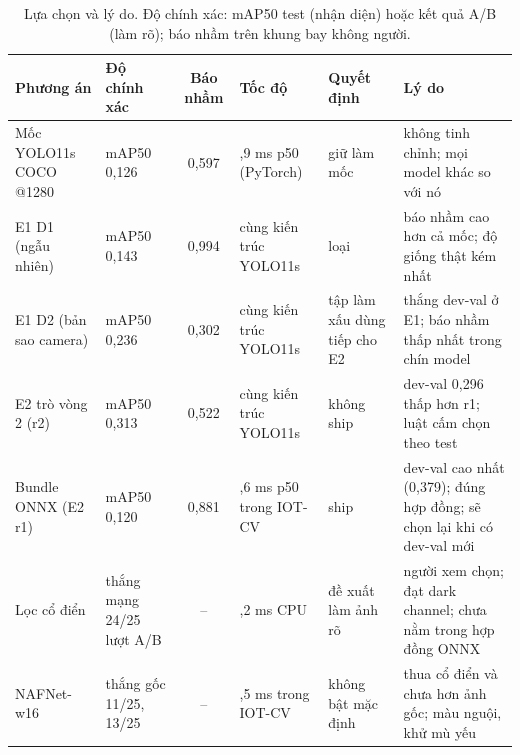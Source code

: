 \begin{table}[!htbp]
\centering\footnotesize
\caption[Lựa chọn và lý do]{Lựa chọn và lý do. Độ chính xác: mAP50 test (nhận diện) hoặc kết quả A/B (làm rõ); báo nhầm trên khung bay không người.}
\label{tab:luachon}
\begin{tabularx}{\textwidth}{@{}>{\raggedright\arraybackslash}p{2.6cm} >{\raggedright\arraybackslash}p{2.3cm} c >{\raggedright\arraybackslash}p{1.7cm} >{\raggedright\arraybackslash}p{1.8cm} X@{}}
\toprule
Phương án & Độ chính xác & Báo nhầm & Tốc độ & Quyết định & Lý do \\
\midrule
Mốc YOLO11s COCO @1280 & mAP50 0,126 & 0,597 & 20,9 ms p50 (PyTorch) & giữ làm mốc & không tinh chỉnh; mọi model khác so với nó \\
\addlinespace
E1 D1 (ngẫu nhiên) & mAP50 0,143 & 0,994 & cùng kiến trúc YOLO11s & loại & báo nhầm cao hơn cả mốc; độ giống thật kém nhất \\
\addlinespace
E1 D2 (bản sao camera) & mAP50 0,236 & 0,302 & cùng kiến trúc YOLO11s & tập làm xấu dùng tiếp cho E2 & thắng dev-val ở E1; báo nhầm thấp nhất trong chín model \\
\addlinespace
E2 trò vòng 2 (r2) & mAP50 0,313 & 0,522 & cùng kiến trúc YOLO11s & không ship & dev-val 0,296 thấp hơn r1; luật cấm chọn theo test \\
\addlinespace
Bundle ONNX (E2 r1) & mAP50 0,120 & 0,881 & 23,6 ms p50 trong IOT-CV & ship & dev-val cao nhất (0,379); đúng hợp đồng; sẽ chọn lại khi có dev-val mới \\
\addlinespace
Lọc cổ điển & thắng mạng 24/25 lượt A/B & – & 9,2 ms CPU & đề xuất làm ảnh rõ & người xem chọn; đạt dark channel; chưa nằm trong hợp đồng ONNX \\
\addlinespace
NAFNet-w16 & thắng gốc 11/25, 13/25 & – & 12,5 ms trong IOT-CV & không bật mặc định & thua cổ điển và chưa hơn ảnh gốc; màu nguội, khử mù yếu \\
\bottomrule
\end{tabularx}
\end{table}

